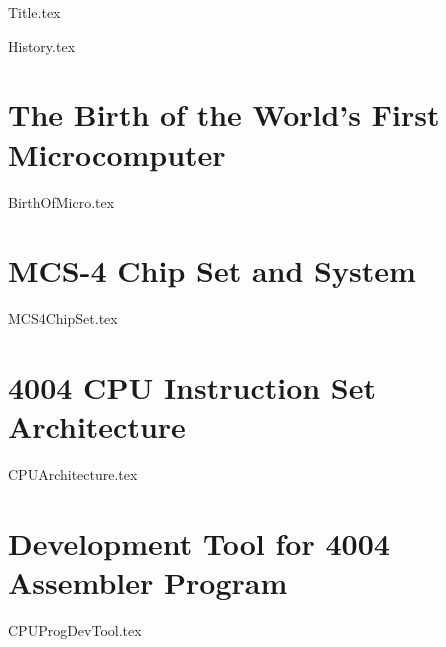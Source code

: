 \documentclass[dvipdfmx, a4paper,12pt]{book}
\begin{document}
\frontmatter

{Title.tex}

{History.tex}

\setcounter{tocdepth}{1}
\tableofcontents
\listoffigures
\listoftables
\lstlistoflistings

\mainmatter


\newpage\chapter{The Birth of the World's First Microcomputer}
{BirthOfMicro.tex}

\newpage\chapter{MCS-4 Chip Set and System}
{MCS4ChipSet.tex}

\newpage\chapter{4004 CPU Instruction Set Architecture}
{CPUArchitecture.tex}

\newpage\chapter{Development Tool for 4004 Assembler Program}
{CPUProgDevTool.tex}
\end{document}
